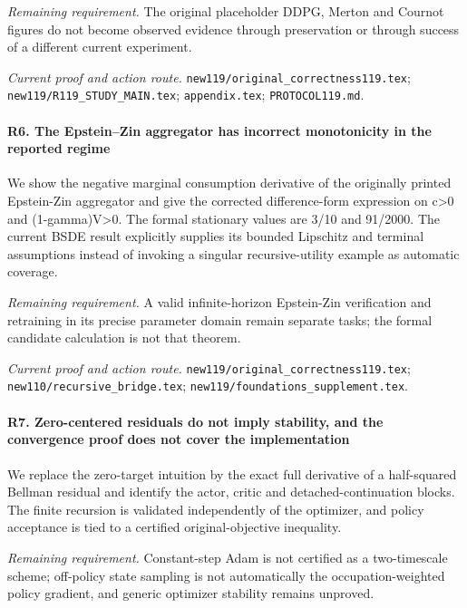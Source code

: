 \par\emph{Remaining requirement.} The original placeholder DDPG, Merton and Cournot figures do not become observed evidence through preservation or through success of a different current experiment.

\par\emph{Current proof and action route.} \nolinkurl{new119/original_correctness119.tex}; \nolinkurl{new119/R119_STUDY_MAIN.tex}; \nolinkurl{appendix.tex}; \nolinkurl{PROTOCOL119.md}.

\paragraph{R6. The Epstein--Zin aggregator has incorrect monotonicity in the reported regime}

We show the negative marginal consumption derivative of the originally printed Epstein-Zin aggregator and give the corrected difference-form expression on c>0 and (1-gamma)V>0. The formal stationary values are 3/10 and 91/2000. The current BSDE result explicitly supplies its bounded Lipschitz and terminal assumptions instead of invoking a singular recursive-utility example as automatic coverage.

\par\emph{Remaining requirement.} A valid infinite-horizon Epstein-Zin verification and retraining in its precise parameter domain remain separate tasks; the formal candidate calculation is not that theorem.

\par\emph{Current proof and action route.} \nolinkurl{new119/original_correctness119.tex}; \nolinkurl{new110/recursive_bridge.tex}; \nolinkurl{new119/foundations_supplement.tex}.

\paragraph{R7. Zero-centered residuals do not imply stability, and the convergence proof does not cover the implementation}

We replace the zero-target intuition by the exact full derivative of a half-squared Bellman residual and identify the actor, critic and detached-continuation blocks. The finite recursion is validated independently of the optimizer, and policy acceptance is tied to a certified original-objective inequality.

\par\emph{Remaining requirement.} Constant-step Adam is not certified as a two-timescale scheme; off-policy state sampling is not automatically the occupation-weighted policy gradient, and generic optimizer stability remains unproved.

